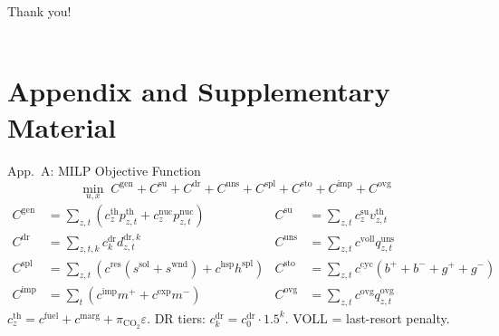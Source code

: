 \documentclass[aspectratio=169, 10pt]{beamer}
\newcommand{\backlink}[2]{\vfill\hfill\hyperlink{#1}{\beamerreturnbutton{\tiny #2}}}
\begin{document}
\begin{frame}[standout]
  Thank you!\\\vspace{1em}{\normalsize Questions \& Discussion}\\
\end{frame}

\appendix
\section*{Appendix and Supplementary Material}


\begin{frame}{App.\ A: MILP Objective Function}
\hypertarget{app:A}{}
\begin{equation*}
\min_{u,x} \; C^{\mathrm{gen}} + C^{\mathrm{su}} + C^{\mathrm{dr}} + C^{\mathrm{uns}} + C^{\mathrm{spl}} + C^{\mathrm{sto}} + C^{\mathrm{imp}} + C^{\mathrm{ovg}}
\end{equation*}
{\small
\begin{align*}
C^{\mathrm{gen}} &= \textstyle\sum_{z,t} ( c^{\mathrm{th}}_z p^{\mathrm{th}}_{z,t} + c^{\mathrm{nuc}}_z p^{\mathrm{nuc}}_{z,t} ) &
C^{\mathrm{su}} &= \textstyle\sum_{z,t} c^{\mathrm{su}}_z v^{\mathrm{th}}_{z,t} \\
C^{\mathrm{dr}} &= \textstyle\sum_{z,t,k} c^{\mathrm{dr}}_k d^{\mathrm{dr},k}_{z,t} &
C^{\mathrm{uns}} &= \textstyle\sum_{z,t} c^{\mathrm{voll}} q^{\mathrm{uns}}_{z,t} \\
C^{\mathrm{spl}} &= \textstyle\sum_{z,t} ( c^{\mathrm{res}} (s^{\mathrm{sol}} + s^{\mathrm{wnd}}) + c^{\mathrm{hsp}} h^{\mathrm{spl}} ) &
C^{\mathrm{sto}} &= \textstyle\sum_{z,t} c^{\mathrm{cyc}} (b^+ + b^- + g^+ + g^-) \\
C^{\mathrm{imp}} &= \textstyle\sum_{t} ( c^{\mathrm{imp}} m^+ + c^{\mathrm{exp}} m^- ) &
C^{\mathrm{ovg}} &= \textstyle\sum_{z,t} c^{\mathrm{ovg}} q^{\mathrm{ovg}}_{z,t}
\end{align*}
}
{\scriptsize $c^{\mathrm{th}}_z = c^{\mathrm{fuel}} + c^{\mathrm{marg}} + \pi_{\mathrm{CO}_2}\varepsilon$.\quad
DR tiers: $c^{\mathrm{dr}}_k = c^{\mathrm{dr}}_0 \cdot 1.5^k$.\quad
VOLL = last-resort penalty.}
\backlink{main:milp}{Block 2: MILP}
\end{frame}
\end{document}
